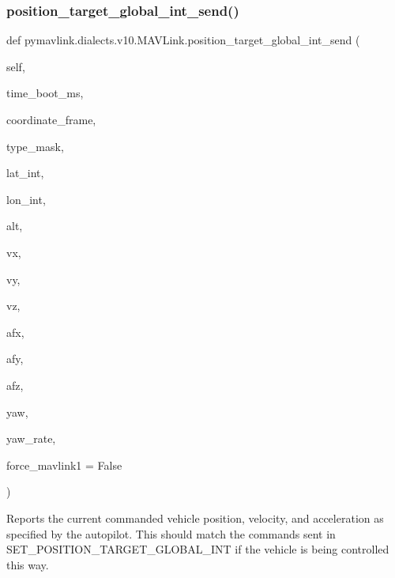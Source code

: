 \begin{DoxyVerb}
\begin{DoxyVerb}
\begin{DoxyVerb}
\begin{DoxyVerb}
\subsubsection{\texorpdfstring{position\+\_\+target\+\_\+global\+\_\+int\+\_\+send()}{position\_target\_global\_int\_send()}}
{\footnotesize\ttfamily def pymavlink.\+dialects.\+v10.\+M\+A\+V\+Link.\+position\+\_\+target\+\_\+global\+\_\+int\+\_\+send (\begin{DoxyParamCaption}\item[{}]{self,  }\item[{}]{time\+\_\+boot\+\_\+ms,  }\item[{}]{coordinate\+\_\+frame,  }\item[{}]{type\+\_\+mask,  }\item[{}]{lat\+\_\+int,  }\item[{}]{lon\+\_\+int,  }\item[{}]{alt,  }\item[{}]{vx,  }\item[{}]{vy,  }\item[{}]{vz,  }\item[{}]{afx,  }\item[{}]{afy,  }\item[{}]{afz,  }\item[{}]{yaw,  }\item[{}]{yaw\+\_\+rate,  }\item[{}]{force\+\_\+mavlink1 = {\ttfamily False} }\end{DoxyParamCaption})}

\begin{DoxyVerb}Reports the current commanded vehicle position, velocity, and
acceleration as specified by the autopilot. This
should match the commands sent in
SET_POSITION_TARGET_GLOBAL_INT if the vehicle is being
controlled this way.


\end{DoxyVerb}
\end{DoxyVerb}
\end{DoxyVerb}
\end{DoxyVerb}
\end{DoxyVerb}
